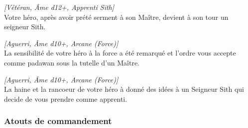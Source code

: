 \begin{description}[align=left]
    \item [Seigneur Sith]
    	\emph{[Vétéran, \^Ame d12+, Apprenti Sith]}\\
        Votre héro, après avoir prété serment à son Maître, devient à son tour un seigneur Sith.

    \item [Padawan]
    	\emph{[Aguerri, \^Ame d10+, Arcane (Force)]}\\
        La sensibilité de votre héro à la force a été remarqué et l'ordre vous accepte comme padawan sous la tutelle d'un Maître.

    \item [Apprenti Sith]
    	\emph{[Aguerri, \^Ame d10+, Arcane (Force)]}\\
        La haine et la rancoeur de votre héro à donné des idées à un Seigneur Sith qui decide de vous prendre comme apprenti.


\end{description}

\subsubsection{Atouts de commandement}

